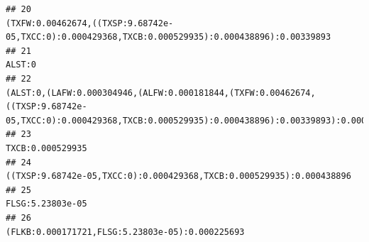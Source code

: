 \documentclass[]{article}
\begin{document}
\begin{verbatim}
## 20                                                                                                                                                                                                                                                                                                                 (TXFW:0.00462674,((TXSP:9.68742e-05,TXCC:0):0.000429368,TXCB:0.000529935):0.000438896):0.00339893
## 21                                                                                                                                                                                                                                                                                                                                                                                                            ALST:0
## 22                                                                                                                                                                                                                               (ALST:0,(LAFW:0.000304946,(ALFW:0.000181844,(TXFW:0.00462674,((TXSP:9.68742e-05,TXCC:0):0.000429368,TXCB:0.000529935):0.000438896):0.00339893):0.000450879):0.000633288):0.00274534
## 23                                                                                                                                                                                                                                                                                                                                                                                                  TXCB:0.000529935
## 24                                                                                                                                                                                                                                                                                                                                              ((TXSP:9.68742e-05,TXCC:0):0.000429368,TXCB:0.000529935):0.000438896
## 25                                                                                                                                                                                                                                                                                                                                                                                                  FLSG:5.23803e-05
## 26                                                                                                                                                                                                                                                                                                                                                                   (FLKB:0.000171721,FLSG:5.23803e-05):0.000225693

\end{verbatim}
\end{document}
